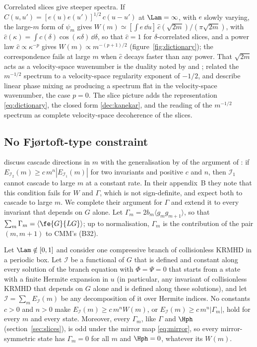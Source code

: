 Correlated slices give steeper spectra. If $C(u,u')=[e(u)e(u')]^{1/2}\,c(u-u')$ at $\Lam=\infty$, with $e$ slowly varying, the large-$m$ form of $\psi_m$ gives $W(m)\simeq[\int e\,\dd u]\,\hat c(\sqrt{2m})/(\pi\sqrt{2m})$, with $\hat c(\kappa)=\int c(\delta)\cos(\kappa\delta)\,\dd\delta$, so that $\hat c=1$ for $\delta$-correlated slices, and a power law $\hat c\propto\kappa^{-p}$ gives $W(m)\propto m^{-(p+1)/2}$ (figure~\ref{fig:dictionary}); the correspondence fails at large $m$ when $\hat c$ decays faster than any power. That $\sqrt{2m}$ acts as a velocity-space wavenumber is the duality noted by \citet{Schekochihin2016} and \citet{AdkinsSchekochihin2018}; \citet[note~81]{Eyink2018} related the $m^{-1/2}$ spectrum to a velocity-space regularity exponent of $-1/2$, and \citet{Nastac2024} describe linear phase mixing as producing a spectrum flat in the velocity-space wavenumber, the case $p=0$. The slice picture adds the representation \eqref{eq:dictionary}, the closed form \eqref{dec:kanekar}, and the reading of the $m^{-1/2}$ spectrum as complete velocity-space decoherence of the slices.

\subsection{No Fj{\o}rtoft-type constraint}\label{dec:sec-fjortoft}

\citet[section~4.1]{Chandran2026} discuss cascade directions in $m$ with the generalisation by \citet{AlexakisBiferale2018} of the argument of \citet{Fjortoft1953}: if $E_{\mathcal I_2}(m)\ge c\,m^n|E_{\mathcal I_1}(m)|$ for two invariants and positive $c$ and $n$, then $\mathcal I_1$ cannot cascade to large $m$ at a constant rate. In their appendix~B they note that this condition fails for $W$ and $\Gamma$, which is not sign-definite, and expect both to cascade to large $m$. We complete their argument for $\Gamma$ and extend it to every invariant that depends on $G$ alone. Let $\Gamma_m=2b_m\langle g_mg_{m+1}\rangle$, so that $\sum_m\Gamma_m=\langle\fe{G}{LG}\rangle$; up to normalisation, $\Gamma_m$ is the contribution of the pair $(m,m+1)$ to CMM's (B32).

\begin{proposition}\label{prop:nofjortoft}
Let $\Lam\notin[0,1]$ and consider one compressive branch of collisionless KRMHD in a periodic box. Let $\mathcal I$ be a functional of $G$ that is defined and constant along every solution of the branch equation with $\Phi=\Psi=0$ that starts from a state with a finite Hermite expansion in $u$ (in particular, any invariant of collisionless KRMHD that depends on $G$ alone and is defined along these solutions), and let $\mathcal I=\sum_mE_{\mathcal I}(m)$ be any decomposition of it over Hermite indices. No constants $c>0$ and $n>0$ make $E_{\mathcal I}(m)\ge c\,m^nW(m)$, or $E_{\mathcal I}(m)\ge c\,m^n|\Gamma_m|$, hold for every $m$ and every state. Moreover, every $\Gamma_m$, like $\Gamma$ and $\Hph$ (section~\ref{sec:slices}), is odd under the mirror map \eqref{eq:mirror}, so every mirror-symmetric state has $\Gamma_m=0$ for all $m$ and $\Hph=0$, whatever its $W(m)$.
\end{proposition}

